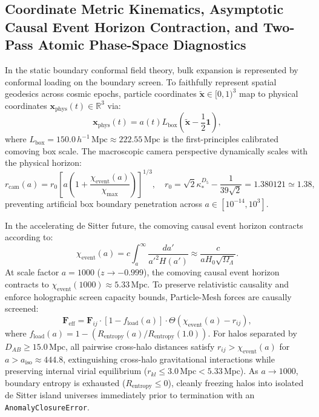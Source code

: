 \documentclass[11pt,letterpaper]{article}
\theoremstyle{plain}
\begin{document}
\subsection{Coordinate Metric Kinematics, Asymptotic Causal Event Horizon Contraction, and Two-Pass Atomic Phase-Space Diagnostics}
In the static boundary conformal field theory, bulk expansion is represented by conformal loading on the boundary screen. To faithfully represent spatial geodesics across cosmic epochs, particle coordinates $\tilde{\mathbf{x}} \in [0, 1)^3$ map to physical coordinates $\mathbf{x}_{\mathrm{phys}}(t) \in \mathbb{R}^3$ via:
\begin{equation}
\mathbf{x}_{\mathrm{phys}}(t) = a(t) L_{\mathrm{box}} \left( \tilde{\mathbf{x}} - \frac{1}{2} \mathbf{1} \right),
\end{equation}
where $L_{\mathrm{box}} = 150.0 \, h^{-1} \, \mathrm{Mpc} \approx 222.55 \, \mathrm{Mpc}$ is the first-principles calibrated comoving box scale. The macroscopic camera perspective dynamically scales with the physical horizon:
\begin{equation}
r_{\mathrm{cam}}(a) = r_0 \left[ a \left(1 + \frac{\chi_{\mathrm{event}}(a)}{\chi_{\mathrm{max}}}\right) \right]^{1/3}, \quad r_0 = \sqrt{2}\kappa_*^{D_5} - \frac{1}{39\sqrt{2}} = 1.380121 \simeq 1.38,
\end{equation}
preventing artificial box boundary penetration across $a \in [10^{-14}, 10^3]$.


In the accelerating de Sitter future, the comoving causal event horizon contracts according to:
\begin{equation}
\chi_{\mathrm{event}}(a) = c \int_a^\infty \frac{da'}{a'^2 H(a')} \approx \frac{c}{a H_0 \sqrt{\Omega_\Lambda}}.
\end{equation}
At scale factor $a = 1000$ ($z \to -0.999$), the comoving causal event horizon contracts to $\chi_{\mathrm{event}}(1000) \approx 5.33 \, \mathrm{Mpc}$. To preserve relativistic causality and enforce holographic screen capacity bounds, Particle-Mesh forces are causally screened:
\begin{equation}
\mathbf{F}_{\mathrm{eff}} = \mathbf{F}_{ij} \cdot [1 - f_{\mathrm{load}}(a)] \cdot \Theta\left(\chi_{\mathrm{event}}(a) - r_{ij}\right),
\end{equation}
where $f_{\mathrm{load}}(a) = 1 - (R_{\mathrm{entropy}}(a) / R_{\mathrm{entropy}}(1.0))$. For halos separated by $D_{AB} \ge 15.0 \, \mathrm{Mpc}$, all pairwise cross-halo distances satisfy $r_{ij} > \chi_{\mathrm{event}}(a)$ for $a > a_{\mathrm{iso}} \approx 444.8$, extinguishing cross-halo gravitational interactions while preserving internal virial equilibrium ($r_{kl} \le 3.0 \, \mathrm{Mpc} < 5.33 \, \mathrm{Mpc}$). As $a \to 1000$, boundary entropy is exhausted ($R_{\mathrm{entropy}} \le 0$), cleanly freezing halos into isolated de Sitter island universes immediately prior to termination with an \texttt{AnomalyClosureError}.
\end{document}
